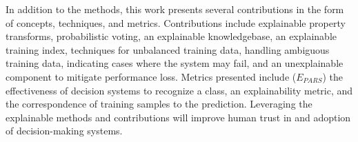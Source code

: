 {In addition to the methods, this work presents several contributions in the form
of concepts, techniques, and metrics. Contributions include explainable property
transforms, probabilistic voting, an explainable knowledgebase, an explainable
training index, techniques for unbalanced training data, handling ambiguous
training data, indicating cases where the system may fail, and an unexplainable
component to mitigate performance loss. Metrics presented include ($E_{PARS}$)
the effectiveness of decision systems to recognize a class, an explainability
metric, and the correspondence of training samples to the prediction. Leveraging
the explainable methods and contributions will improve human trust in and
adoption of decision-making systems.

\thispagestyle{plain} %
}
